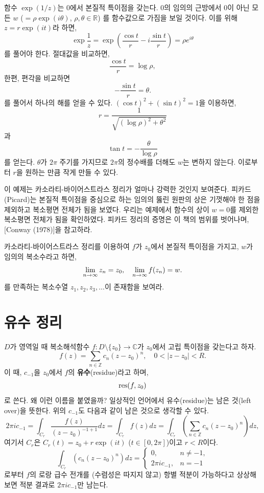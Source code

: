 \begin{saltexample}[label=example-4-17]{}{}
함수 $\exp (1/z)$는 $0$에서 본질적 특이점을 갖는다.
$0$의 임의의 근방에서
$0$이 아닌 모든  $w$ ($=\rho \exp(i\theta)$, $\rho, \theta \in \mathbb R$)
를 함수값으로 가짐을 보일 것이다.
이를 위해 $z= r\exp(it)$라 하면,
\[
\exp \dfrac 1z = \exp \left( \dfrac {\cos t}r  - i \dfrac{\sin t}r\right) 
= \rho e^{i\theta}
\]
를 풀어야 한다.
절대값을 비교하면,
\[
\dfrac{\cos t}r = \log \rho,
\]
한편, 편각을 비교하면
\[
- \dfrac{\sin t}r = \theta.
\]
를 풀어서 하나의 해를 얻을 수 있다.
$(\cos t)^2 + (\sin t)^2 =1$을 이용하면,
\[
r = \dfrac1{\sqrt{(\log \rho)^2 + \theta^2}}
\]
과 
\[
\tan t = - \dfrac{\theta}{\log \rho}
\]
를 얻는다. $\theta$가 $2\pi$ 주기를 가지므로
$2\pi$의 정수배를 더해도 $w$는 변하지 않는다. 
이로부터 $r$을 원하는 만큼 작게 만들 수 있다.
\end{saltexample}

이 예제는 카소라티-바이어스트라스 정리가 얼마나 강력한 것인지 보여준다.
피카드(Picard)는 본질적 특이점을 중심으로 하는 임의의 뚫린 원판의 상은
기껏해야 한 점을 제외하고 복소평면 전체가 됨을 보였다.
우리는 예제에서 함수의 상이 $w=0$를 제외한 복소평면 전체가 됨을 확인하였다.
피카드 정리의 증명은 이 책의 범위를 벗어나며, [Conway (1978)]을 참고하라.

\begin{salt_exercise}\label{ex-4-39}
카소라티-바이어스트라스 정리를 이용하여
$f$가 $z_0$에서 본질적 특이점을 가지고,
$w$가 임의의 복소수라고 하면,
\[
\lim\limits_{n\to \infty} z_n = z_0,
\quad
\lim\limits_{n\to\infty} f(z_n) = w.
\]
를 만족하는 복소수열 $z_1, z_2, z_3, \ldots$이 존재함을 보여라.
\end{salt_exercise}

\section{유수 정리}

$D$가 영역일 때
복소해석함수 $f:D\setminus \{z_0\}\to \mathbb C$가
$z_0$에서 고립 특이점을 갖는다고 하자.
\[
f(z) = \sum_{n\in\mathbb Z} c_n (z-z_0)^n,\quad
0<|z-z_0|<R.
\]
이 때, $c_{-1}$을 $z_0$에서 $f$의 {\bf 유수}(residue)라고 하며,
\[
\mathop{\mathrm{res}}(f,z_0)
\]
로 쓴다.
왜 이런 이름을 붙였을까?
일상적인 언어에서 유수(residue)는 남은 것(left over)을 뜻한다.
위의 $c_{-1}$도 다음과 같이 남은 것으로 생각할 수 있다.
\[
2\pi i c_{-1} = \int_{C_r} \dfrac{f(z)}{(z-z_0)^{-1+1}}dz
= \int_{C_r} f(z)dz 
= \int_{C_r} \left( \sum_{n\in\mathbb Z}c_n(z-z_0)^n\right) dz,
\]
여기서 $C_r$은 $C_r(t) = z_0 + r\exp(it)$ ($t\in[0,2\pi]$)이고
$r<R$이다.
\[
\int_{C_r} \left( c_n(z-z_0)^n \right) dz = 
\begin{cases}
0, & n\ne -1, \\
2\pi i c_{-1}, & n= -1
\end{cases}
\]
로부터 $f$의 로랑 급수 전개를 (수렴성은 따지지 않고) 항별 적분이 가능하다고 
상상해보면 적분 결과로 $2\pi i c_{-1}$만 남는다.

